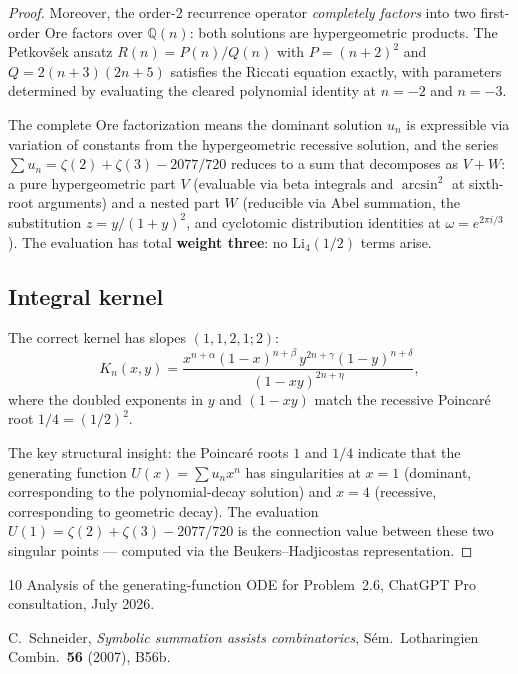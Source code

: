 \documentclass[11pt]{article}
\begin{document}
\begin{proof}
Moreover, the order-2 recurrence operator \emph{completely factors}
into two first-order Ore factors over $\mathbb{Q}(n)$:
both solutions are hypergeometric products.  The Petkov\v{s}ek
ansatz $R(n) = P(n)/Q(n)$ with $P = (n+2)^2$ and
$Q = 2(n+3)(2n+5)$ satisfies the Riccati equation exactly,
with parameters determined by evaluating the cleared polynomial
identity at $n = -2$ and $n = -3$.

The complete Ore factorization means the dominant solution
$u_n$ is expressible via variation of constants from
the hypergeometric recessive solution, and the series
$\sum u_n = \zeta(2) + \zeta(3) - 2077/720$ reduces to
a sum that decomposes as $V + W$: a pure hypergeometric part $V$
(evaluable via beta integrals and $\arcsin^2$ at sixth-root
arguments) and a nested part $W$ (reducible via Abel summation,
the substitution $z = y/(1+y)^2$, and cyclotomic distribution
identities at $\omega = e^{2\pi i/3}$).
The evaluation has total \textbf{weight three}: no
$\mathrm{Li}_4(1/2)$ terms arise.

\subsection{Integral kernel}

The correct kernel has slopes $(1,1,2,1;2)$:
\[
K_n(x,y) = \frac{x^{n+\alpha}(1-x)^{n+\beta}\,
  y^{2n+\gamma}(1-y)^{n+\delta}}{(1-xy)^{2n+\eta}},
\]
where the doubled exponents in $y$ and $(1-xy)$ match the
recessive Poincar\'e root $1/4 = (1/2)^2$.

The key structural insight: the Poincar\'e roots $1$ and $1/4$
indicate that the generating function $U(x) = \sum u_n x^n$
has singularities at $x = 1$ (dominant, corresponding to the
polynomial-decay solution) and $x = 4$ (recessive, corresponding
to geometric decay).  The evaluation $U(1) = \zeta(2) + \zeta(3)
- 2077/720$ is the connection value between these two singular
points --- computed via the Beukers--Hadjicostas representation.
\end{proof}

\begin{thebibliography}{10}
Analysis of the generating-function ODE for Problem~2.6,
ChatGPT Pro consultation, July 2026.

C.~Schneider,
\emph{Symbolic summation assists combinatorics},
S\'em.\ Lotharingien Combin.\ \textbf{56} (2007), B56b.
\end{thebibliography}
\end{document}
